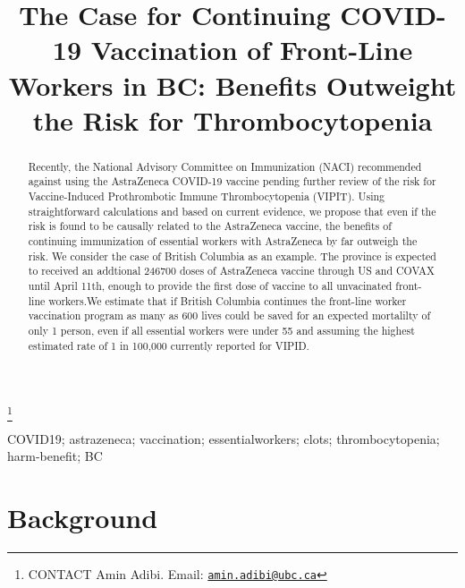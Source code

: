 \documentclass[]{interact}
\theoremstyle{plain}%
\theoremstyle{definition}
\theoremstyle{remark}
\begin{document}

\title{The Case for Continuing COVID-19 Vaccination of Front-Line
Workers in BC: Benefits Outweight the Risk for Thrombocytopenia}


\author{
}

\thanks{CONTACT Amin
Adibi. Email: \href{mailto:amin.adibi@ubc.ca}{\nolinkurl{amin.adibi@ubc.ca}}}

\maketitle

\begin{abstract}
Recently, the National Advisory Committee on Immunization (NACI)
recommended against using the AstraZeneca COVID-19 vaccine pending
further review of the risk for Vaccine-Induced Prothrombotic Immune
Thrombocytopenia (VIPIT). Using straightforward calculations and based
on current evidence, we propose that even if the risk is found to be
causally related to the AstraZeneca vaccine, the benefits of continuing
immunization of essential workers with AstraZeneca by far outweigh the
risk. We consider the case of British Columbia as an example. The
province is expected to received an addtional 246700 doses of
AstraZeneca vaccine through US and COVAX until April 11th, enough to
provide the first dose of vaccine to all unvacinated front-line
workers.We estimate that if British Columbia continues the front-line
worker vaccination program as many as 600 lives could be saved for an
expected mortalilty of only 1 person, even if all essential workers were
under 55 and assuming the highest estimated rate of 1 in 100,000
currently reported for VIPID.
\end{abstract}

\begin{keywords}
COVID19; astrazeneca; vaccination; essentialworkers; clots;
thrombocytopenia; harm-benefit; BC
\end{keywords}

\hypertarget{background}{%
\section{Background}\label{background}}
\end{document}
